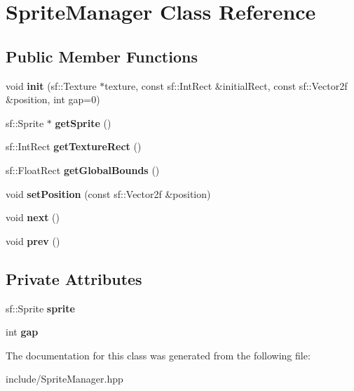 \hypertarget{class_sprite_manager}{}\section{Sprite\+Manager Class Reference}
\label{class_sprite_manager}
\subsection*{Public Member Functions}
\begin{DoxyCompactItemize}
\item 
\mbox{\label{class_sprite_manager_a6bc9f6b77d54099de6fcf84ec1e360bd}} 
void {\bfseries init} (sf\+::\+Texture $\ast$texture, const sf\+::\+Int\+Rect \&initial\+Rect, const sf\+::\+Vector2f \&position, int gap=0)
\item 
\mbox{\label{class_sprite_manager_a9c0af555f22c9ea83a07ae3d1818db0e}} 
sf\+::\+Sprite $\ast$ {\bfseries get\+Sprite} ()
\item 
\mbox{\label{class_sprite_manager_af51994d0f3a5e847a8c55bb022f8b1e2}} 
sf\+::\+Int\+Rect {\bfseries get\+Texture\+Rect} ()
\item 
\mbox{\label{class_sprite_manager_af4b1373fb34c1bf091e5023fe52c1bc0}} 
sf\+::\+Float\+Rect {\bfseries get\+Global\+Bounds} ()
\item 
\mbox{\label{class_sprite_manager_a9ef427743db56baec20673d877a63717}} 
void {\bfseries set\+Position} (const sf\+::\+Vector2f \&position)
\item 
\mbox{\label{class_sprite_manager_acdcd181f96ed049db0bf445a71e4b6e2}} 
void {\bfseries next} ()
\item 
\mbox{\label{class_sprite_manager_a45d2b2613bb95d34ce8e0ad28e261ef1}} 
void {\bfseries prev} ()
\end{DoxyCompactItemize}
\subsection*{Private Attributes}
\begin{DoxyCompactItemize}
\item 
\mbox{\label{class_sprite_manager_aaa4c24e6db93bef8a28b38cb8de839c1}} 
sf\+::\+Sprite {\bfseries sprite}
\item 
\mbox{\label{class_sprite_manager_a57bba66a27411c59651af826b50ec11d}} 
int {\bfseries gap}
\end{DoxyCompactItemize}


The documentation for this class was generated from the following file\+:\begin{DoxyCompactItemize}
\item 
include/Sprite\+Manager.\+hpp\end{DoxyCompactItemize}
